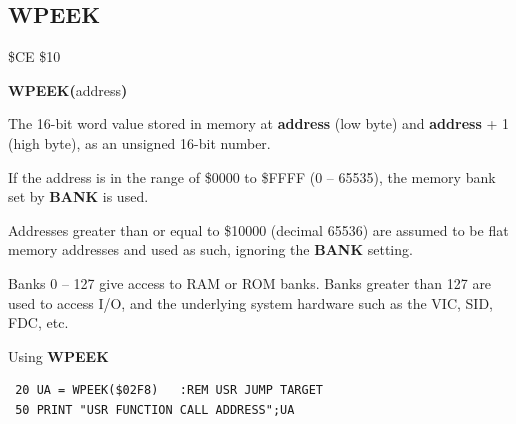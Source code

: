 \newpage
\subsection{WPEEK}
\begin{description}[leftmargin=2cm,style=nextline]
\item [Token:] \$CE \$10
\item [Format:] {\bf WPEEK(}address{\bf)}
\item [Returns:]  The 16-bit word value stored in memory at {\bf address} (low byte) and
                {\bf address} + 1 (high byte), as an unsigned 16-bit number.

                If the address is in the range of \$0000 to \$FFFF (0 -- 65535), the
                memory bank set by {\bf BANK} is used.

                Addresses greater than or equal to \$10000 (decimal 65536) are assumed to be flat memory
                addresses and used as such, ignoring the {\bf BANK} setting.

\item [Remarks:] Banks 0 -- 127 give access to RAM or ROM banks.
                 Banks greater than 127 are used to access I/O,
                  and the underlying system hardware such as the
                 VIC, SID, FDC, etc.
\item [Example:] Using {\bf WPEEK}

\begin{tcolorbox}[colback=black,coltext=white]
\verbatimfont{\codefont}
\begin{verbatim}
 20 UA = WPEEK($02F8)   :REM USR JUMP TARGET
 50 PRINT "USR FUNCTION CALL ADDRESS";UA
\end{verbatim}
\end{tcolorbox}
\end{description}


\newpage
